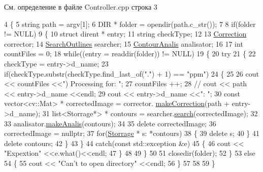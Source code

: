 См. определение в файле Controller.\+cpp строка 3


\begin{DoxyCode}
4 \{
5     \textcolor{keywordtype}{string} path = argv[1];
6     DIR * folder = opendir(path.c\_str());
7 
8     \textcolor{keywordflow}{if}(folder != NULL)
9     \{
10         \textcolor{keyword}{struct }dirent * entry;
11         \textcolor{keywordtype}{string} checkType;
12 
13         \hyperlink{class_correction}{Correction} corrector;
14         \hyperlink{class_search_outlines}{SearchOutlines} searcher;
15         \hyperlink{class_contour_analis}{ContourAnalis} analisator;
16 
17         \textcolor{keywordtype}{int} countFiles = 0;
18         \textcolor{keywordflow}{while}((entry = readdir(folder)) != NULL)
19         \{
20             \textcolor{keywordflow}{try}
21             \{
22                 checkType = entry->d\_name;
23                 \textcolor{keywordflow}{if}(checkType.substr(checkType.find\_last\_of(\textcolor{stringliteral}{"."}) + 1) == \textcolor{stringliteral}{"ppm"})
24                 \{
25 
26                     cout << countFiles <<\textcolor{stringliteral}{") Processing for: "};
27                     countFiles ++;
28 \textcolor{comment}{//                    cout << path << entry->d\_name <<endl;}
29                     cout << entry->d\_name <<\textcolor{stringliteral}{": "};
30                     \textcolor{keyword}{const} vector<cv::Mat> * correctedImage = corrector.
      \hyperlink{class_correction_a2a43e98d77beaf6fee39a6fe1bbfbb26}{makeCorrection}(path + entry->d\_name);
31                     list<Storrage*> * contours = searcher.\hyperlink{class_search_outlines_af38a752797a850533995230928187e32}{search}(correctedImage);
32 
33                     analisator.\hyperlink{class_contour_analis_a8c398a82aced99e9e44b378743652a90}{makeAnalis}(contours);
34 
35                     \textcolor{keyword}{delete} correctedImage;
36                     correctedImage = \textcolor{keyword}{nullptr};
37                     \textcolor{keywordflow}{for}(\hyperlink{class_storrage}{Storrage} * s: *contours)
38                     \{
39                         \textcolor{keyword}{delete} s;
40                     \}
41                     \textcolor{keyword}{delete} contours;
42                 \}
43              \}
44              \textcolor{keywordflow}{catch}(\textcolor{keyword}{const} std::exception &e)
45              \{
46                 cout << \textcolor{stringliteral}{"Expextion"} <<e.what()<<endl;
47              \}
48 
49         \}
50 
51         closedir(folder);
52     \}
53     \textcolor{keywordflow}{else}
54     \{
55         cout << \textcolor{stringliteral}{"Can't to open directory"} <<endl;
56     \}
57 
58 
59 \}
\end{DoxyCode}
